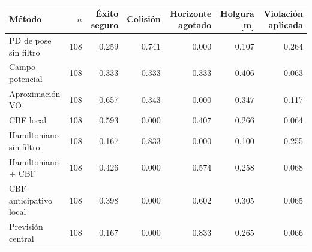 \begin{tabular}{lrrrrrr}
\toprule
Método & $n$ & Éxito seguro & Colisión & Horizonte agotado & Holgura [m] & Violación aplicada \\
\midrule
PD de pose sin filtro & 108 & 0.259 & 0.741 & 0.000 & 0.107 & 0.264 \\
Campo potencial & 108 & 0.333 & 0.333 & 0.333 & 0.406 & 0.063 \\
Aproximación VO & 108 & 0.657 & 0.343 & 0.000 & 0.347 & 0.117 \\
CBF local & 108 & 0.593 & 0.000 & 0.407 & 0.266 & 0.064 \\
Hamiltoniano sin filtro & 108 & 0.167 & 0.833 & 0.000 & 0.100 & 0.255 \\
Hamiltoniano + CBF & 108 & 0.426 & 0.000 & 0.574 & 0.258 & 0.068 \\
CBF anticipativo local & 108 & 0.398 & 0.000 & 0.602 & 0.305 & 0.065 \\
Previsión central & 108 & 0.167 & 0.000 & 0.833 & 0.265 & 0.066 \\
\bottomrule
\end{tabular}
